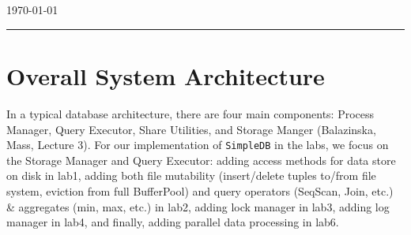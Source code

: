 \documentclass[12pt]{myland}
\begin{document}
\begin{center}
	{\Large {}} \\
	\vspace{.05in}
    \quad{}\\
	\vspace{.05in}
    \today \\
\end{center}
\vspace{.15in} \hrule \vspace{0.5em}%

\section{Overall System Architecture}
	\label{overview}

	\par In a typical database architecture, there are four main components: Process Manager, Query Executor, Share
Utilities, and Storage Manger (Balazinska, Mass, Lecture 3). For our implementation of \texttt{SimpleDB} in the labs,
we focus on the Storage Manager and Query Executor: adding access methods for data store on disk in lab1, adding both file
mutability (insert/delete tuples to/from file system, eviction from full BufferPool) and query operators (SeqScan, Join,
etc.) \& aggregates (min, max, etc.) in lab2, adding lock manager in lab3, adding log manager in lab4, and finally, adding
parallel data processing in lab6.
\end{document}
